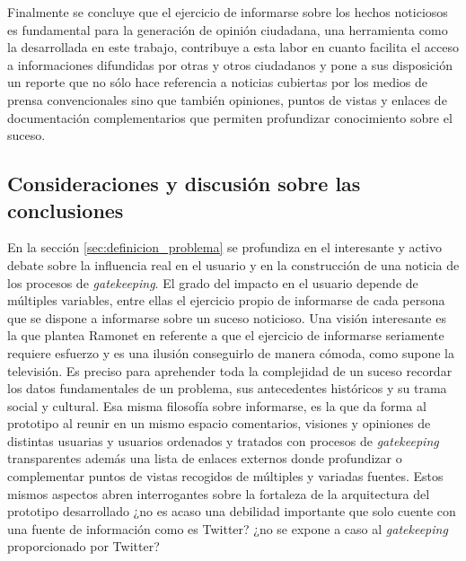 Finalmente se concluye que el ejercicio de informarse sobre los hechos noticiosos es fundamental para la generación de opinión ciudadana, una herramienta como la desarrollada en este trabajo, contribuye a esta labor en cuanto facilita el acceso a informaciones difundidas por otras y otros ciudadanos y pone a sus disposición un reporte que no sólo hace referencia a noticias cubiertas por los medios de prensa convencionales sino que también opiniones, puntos de vistas y enlaces de documentación complementarios que permiten profundizar conocimiento sobre el suceso. 




\subsection{Consideraciones y discusión sobre las conclusiones}

En la sección \ref{sec:definicion_problema} se profundiza en el interesante y activo debate sobre la influencia real en el usuario y en la construcción de una noticia de los procesos de \emph{gatekeeping}. El grado del impacto en el usuario depende de múltiples variables, entre ellas el ejercicio propio de informarse de cada persona que se dispone a informarse sobre un suceso noticioso. Una visión interesante es la que plantea Ramonet en \cite{fatigaInformarse} referente a que el ejercicio de informarse seriamente requiere esfuerzo y es una ilusión conseguirlo de manera cómoda, como supone la televisión. Es preciso para aprehender toda la complejidad de un suceso recordar los datos fundamentales de un problema, sus antecedentes históricos y su trama social y cultural. Esa misma filosofía sobre informarse, es la que da forma al prototipo al reunir en un mismo espacio comentarios, visiones y opiniones de distintas usuarias y usuarios ordenados y tratados con procesos de \emph{gatekeeping} transparentes además una lista de enlaces externos donde profundizar o complementar puntos de vistas recogidos de múltiples y variadas fuentes. Estos mismos aspectos abren interrogantes sobre la fortaleza de la arquitectura del prototipo desarrollado ¿no es acaso una debilidad importante que solo cuente con una fuente de información como es Twitter? ¿no se expone a caso al \emph{gatekeeping} proporcionado por Twitter?

